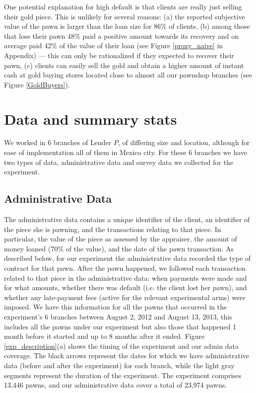 \documentclass[oneside,11pt]{article}
\begin{document}
One potential explanation for high default is that clients are really just selling their gold piece. This is unlikely for several reasons: (a) the reported subjective value of the pawn is larger than the loan size for 86\% of clients, (b) among those that lose their pawn 48\% paid a positive amount towards its recovery and on average paid 42\% of the value of their loan (see Figure \ref{proxy_naive} in Appendix) --- this can only be rationalized if they expected to recover their pawn, (c) clients can easily sell the gold and obtain a higher amount of instant cash at gold buying stores located close to almost all our pawnshop branches (see Figure \ref{GoldBuyers}). %




    
\section{Data and summary stats} \label{Data}
    
We worked in 6 branches of Lender $P$, of differing size and location, although for ease of implementation all of them in Mexico city. For these 6 branches we have two types of data, administrative data and survey data we collected for the experiment. 

\subsection{Administrative Data}
The administrative data contains a unique identifier of the client, an identifier of the piece she is pawning, and the transactions relating to that piece. In particular, the value of the piece as assessed by the appraiser, the amount of money loaned (70\% of the value), and the date of the pawn transaction. As described below, for our experiment the administrative data recorded the type of contract for that pawn. After the pawn happened, we followed each transaction related to that piece in the administrative data: when payments were made and for what amounts, whether there was default (i.e. the client lost her pawn), and whether any late-payment fees (active for the relevant experimental arms) were imposed. We have this information for all the pawns that occurred in the experiment's 6 branches between August 2, 2012 and August 13, 2013, this includes all the pawns under our experiment but also those that happened 1 month before it started and up to 8 months after it ended. Figure \ref{exp_description}(a) shows the timing of the experiment and our admin data coverage. The black arrows represent the dates for which we have administrative data (before and after the experiment) for each branch, while the light gray segments represent the duration of the experiment. The experiment comprises 13,446 pawns, and our administrative data cover a total of 23,974 pawns.
\end{document}
